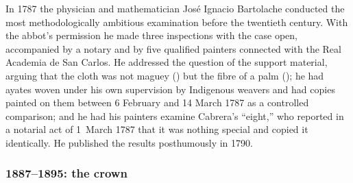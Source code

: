 In 1787 the physician and mathematician Jos\'e Ignacio Bartolache
conducted the most methodologically ambitious examination before the
twentieth century. With the abbot's permission he made three
inspections with the case open, accompanied by a notary and by five
qualified painters connected with the Real Academia de San Carlos.
He addressed the question of the support material, arguing that the
cloth was not maguey () but the fibre of a palm
(); he had ayates woven under his own supervision by
Indigenous weavers and had copies painted on them between 6 February
and 14 March 1787 as a controlled comparison; and he had his painters
examine Cabrera's ``eight,'' who reported in a notarial act of
1~March 1787 that it was nothing special and copied it identically.
He published the results posthumously in 1790.

\subsubsection*{1887--1895: the crown}

